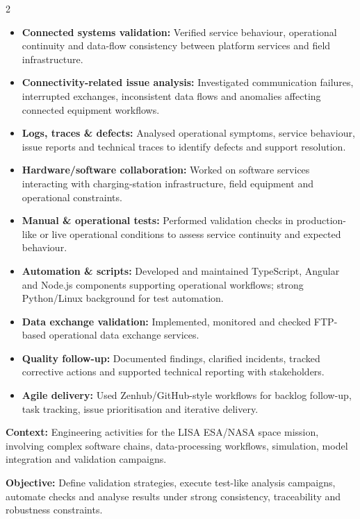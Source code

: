 \documentclass[8pt,a4paper,ragged2e,withhyper]{altacv}
\begin{document}
\begin{paracol}{2}
\begin{itemize}
  \item \textbf{Connected systems validation:} Verified service behaviour, operational continuity and data-flow consistency between platform services and field infrastructure.
  \item \textbf{Connectivity-related issue analysis:} Investigated communication failures, interrupted exchanges, inconsistent data flows and anomalies affecting connected equipment workflows.
  \item \textbf{Logs, traces \& defects:} Analysed operational symptoms, service behaviour, issue reports and technical traces to identify defects and support resolution.
  \item \textbf{Hardware/software collaboration:} Worked on software services interacting with charging-station infrastructure, field equipment and operational constraints.
  \item \textbf{Manual \& operational tests:} Performed validation checks in production-like or live operational conditions to assess service continuity and expected behaviour.
  \item \textbf{Automation \& scripts:} Developed and maintained TypeScript, Angular and Node.js components supporting operational workflows; strong Python/Linux background for test automation.
  \item \textbf{Data exchange validation:} Implemented, monitored and checked FTP-based operational data exchange services.
  \item \textbf{Quality follow-up:} Documented findings, clarified incidents, tracked corrective actions and supported technical reporting with stakeholders.
  \item \textbf{Agile delivery:} Used Zenhub/GitHub-style workflows for backlog follow-up, task tracking, issue prioritisation and iterative delivery.
\end{itemize}

\divider


\textbf{Context:} Engineering activities for the LISA ESA/NASA space mission, involving complex software chains, data-processing workflows, simulation, model integration and validation campaigns.

\textbf{Objective:} Define validation strategies, execute test-like analysis campaigns, automate checks and analyse results under strong consistency, traceability and robustness constraints.


\end{paracol}
\end{document}
